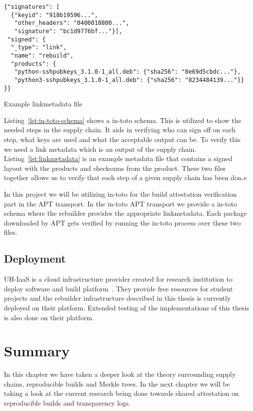 \documentclass[../Main/thesis.tex]{subfiles}
\begin{document}
\begin{listing}[H]
\begin{verbatim}
{"signatures": [
  {"keyid": "918b19596...",
   "other_headers": "0400010800...",
   "signature": "bc1d9776bf..."}],
 "signed": {
  "_type": "link",
  "name": "rebuild",
  "products": {
   "python-sshpubkeys_3.1.0-1_all.deb": {"sha256": "8e69d5cbdc..."},
   "python3-sshpubkeys_3.1.0-1_all.deb": {"sha256": "8234484139..."}}
}}
\end{verbatim}
\caption{Example linkmetadata file}
\label{lst:linkmetadata}
\end{listing}

Listing~\ref{lst:in-toto-schema} shows a in-toto schema. This is utilized to
show the needed steps in the supply chain. It aids in verifying who can sign off
on each step, what keys are used and what the acceptable output can be. To
verify this we need a link metadata which is an output of the supply chain.
Listing~\ref{lst:linkmetadata} is an example metadata file that contains a
signed layout with the products and checksums from the product. These two files
together allows us to verify that each step of a given supply chain has been
don.e

In this project we will be utilizing in-toto for the build attestation
verification part in the APT transport. In the in-toto APT transport we provide a
in-toto schema where the rebuilder provides the appropriate linkmetadata. Each
package downloaded by APT gets verified by running the in-toto process over
these two files.


\subsection*{Deployment}%
\label{sub:deployment}
UH-IaaS is a cloud infrastructure provider created for research institution to
deploy software and build platform~\cite{uhiaas}. They provide free resources for student
projects and the rebuilder infrastructure described in this thesis is currently
deployed on their platform. Extended testing of the implementations of this
thesis is also done on their platform.


\section*{Summary}\label{sec:summary-technologies} 
In this chapter we have taken a deeper look at the theory surrounding supply
chains, reproducible builds and Merkle trees. In the next chapter we will be
taking a look at the current research being done towards shared attestation on
reproducible builds and transparency logs.
\end{document}
